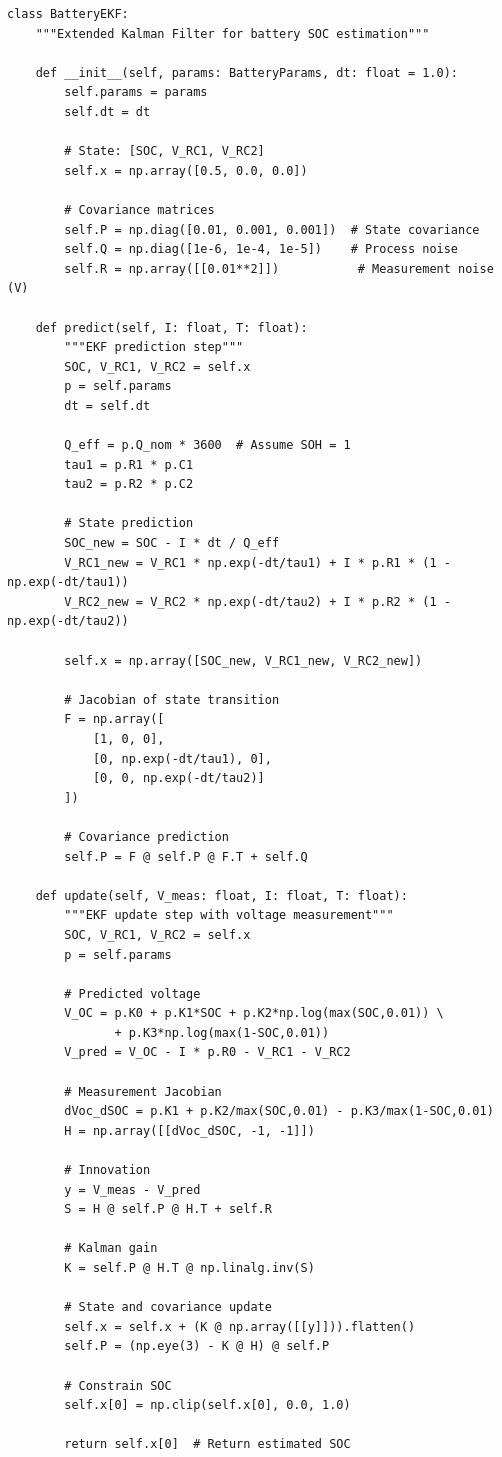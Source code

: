 \begin{lstlisting}[caption={EKF Implementation for Online SOC Estimation}, label={lst:ekf}]
class BatteryEKF:
    """Extended Kalman Filter for battery SOC estimation"""
    
    def __init__(self, params: BatteryParams, dt: float = 1.0):
        self.params = params
        self.dt = dt
        
        # State: [SOC, V_RC1, V_RC2]
        self.x = np.array([0.5, 0.0, 0.0])
        
        # Covariance matrices
        self.P = np.diag([0.01, 0.001, 0.001])  # State covariance
        self.Q = np.diag([1e-6, 1e-4, 1e-5])    # Process noise
        self.R = np.array([[0.01**2]])           # Measurement noise (V)
    
    def predict(self, I: float, T: float):
        """EKF prediction step"""
        SOC, V_RC1, V_RC2 = self.x
        p = self.params
        dt = self.dt
        
        Q_eff = p.Q_nom * 3600  # Assume SOH = 1
        tau1 = p.R1 * p.C1
        tau2 = p.R2 * p.C2
        
        # State prediction
        SOC_new = SOC - I * dt / Q_eff
        V_RC1_new = V_RC1 * np.exp(-dt/tau1) + I * p.R1 * (1 - np.exp(-dt/tau1))
        V_RC2_new = V_RC2 * np.exp(-dt/tau2) + I * p.R2 * (1 - np.exp(-dt/tau2))
        
        self.x = np.array([SOC_new, V_RC1_new, V_RC2_new])
        
        # Jacobian of state transition
        F = np.array([
            [1, 0, 0],
            [0, np.exp(-dt/tau1), 0],
            [0, 0, np.exp(-dt/tau2)]
        ])
        
        # Covariance prediction
        self.P = F @ self.P @ F.T + self.Q
    
    def update(self, V_meas: float, I: float, T: float):
        """EKF update step with voltage measurement"""
        SOC, V_RC1, V_RC2 = self.x
        p = self.params
        
        # Predicted voltage
        V_OC = p.K0 + p.K1*SOC + p.K2*np.log(max(SOC,0.01)) \
               + p.K3*np.log(max(1-SOC,0.01))
        V_pred = V_OC - I * p.R0 - V_RC1 - V_RC2
        
        # Measurement Jacobian
        dVoc_dSOC = p.K1 + p.K2/max(SOC,0.01) - p.K3/max(1-SOC,0.01)
        H = np.array([[dVoc_dSOC, -1, -1]])
        
        # Innovation
        y = V_meas - V_pred
        S = H @ self.P @ H.T + self.R
        
        # Kalman gain
        K = self.P @ H.T @ np.linalg.inv(S)
        
        # State and covariance update
        self.x = self.x + (K @ np.array([[y]])).flatten()
        self.P = (np.eye(3) - K @ H) @ self.P
        
        # Constrain SOC
        self.x[0] = np.clip(self.x[0], 0.0, 1.0)
        
        return self.x[0]  # Return estimated SOC
\end{lstlisting}

